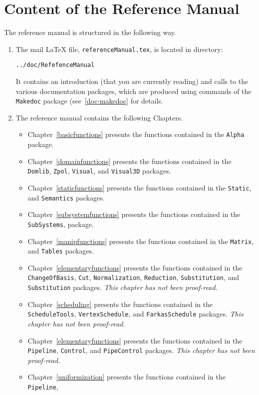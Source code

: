 \documentclass[11pt]{report}
\begin{document}
\section{Content of the Reference Manual}
The reference manual is structured in the following way.
\begin{enumerate}
\item The mail \LaTeX{} file, \texttt{referenceManual.tex}, is located in 
directory:
\begin{verbatim}
../doc/RefefenceManual
\end{verbatim}
It contains an introduction (that you are currently reading) and calls to 
the various documentation packages, which are produced using commands
of the \texttt{Makedoc} package (see~\ref{doc-makedoc} for details.
\item The reference manual contains 
the following
Chapters.
\begin{itemize}
\item Chapter~\ref{basicfunctions} presents the functions contained in the \texttt{Alpha} 
package. 
\item Chapter~\ref{domainfunctions} presents the functions contained in the \texttt{Domlib},
\texttt{Zpol},
\texttt{Visual}, and \texttt{Visual3D}
packages. 
\item Chapter~\ref{staticfunctions} presents the functions contained in the \texttt{Static},
and \texttt{Semantics}
packages. 
\item Chapter~\ref{subsystemfunctions} presents the functions contained in the \texttt{SubSystems},
package. 
\item Chapter~\ref{manipfunctions} presents the functions contained in the \texttt{Matrix},
and \texttt{Tables}
packages. 
\item Chapter~\ref{elementaryfunctions} presents the functions contained in the \texttt{ChangeOfBasis},
\texttt{Cut},
\texttt{Normalization}, 
\texttt{Reduction}, 
\texttt{Substitution}, 
and \texttt{Substitution}
packages. {\em This chapter has not been proof-read.}
\item Chapter~\ref{scheduling} presents the functions contained in the \texttt{ScheduleTools}, 
\texttt{VertexSchedule}, 
and \texttt{FarkasSchedule}
packages. {\em This chapter has not been proof-read.}
\item Chapter~\ref{elementaryfunctions} presents the functions contained in the \texttt{Pipeline},
\texttt{Control},
and \texttt{PipeControl}
packages. {\em This chapter has not been proof-read.}
\item Chapter~\ref{uniformization} presents the functions contained in the \texttt{Pipeline},

\end{itemize}
\end{enumerate}
\end{document}
